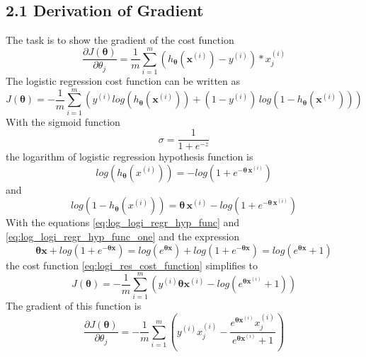\subsection{2.1 Derivation of Gradient}
\label{subsec:task_2_1}

The task is to show the gradient of the cost function
\begin{equation}\label{eq:parameters_gradient}
\frac{\partial J(\bm\theta)}{\partial \theta_{j}} = \frac{1}{m}\sum_{i=1}^{m} (h_{\bm\theta}(\bm x^{(i)}) - y^{(i)}) * x_{j}^{(i)}
\end{equation}
The logistic regression cost function can be written as
\begin{equation}
\label{eq:logi_res_cost_function}
J(\bm\theta) = - \frac{1}{m}\sum_{i=1}^{m} (y^{(i)} log(h_{\bm\theta}(\bm x^{(i)})) + (1 - y^{(i)}) \, log(1 - h_{\bm\theta}(\bm x^{(i)})))
\end{equation}
With the sigmoid function
\begin{equation}
\label{eq:sigmoid_function}
\sigma = \frac{1}{1 + e^{-z}}
\end{equation}
the logarithm of logistic regression hypothesis function is
\begin{equation}
\label{eq:log_logi_regr_hyp_func}
log( h_{\bm\theta}(x^{(i)}) )= - log(1 + e^{-\bm\theta \, \bm x^{(i)}})
\end{equation}
and 
\begin{equation}
\label{eq:log_logi_regr_hyp_func_one}
log( 1 - h_{\bm\theta}(x^{(i)}) ) = \bm\theta \, \bm x^{(i)} - log(1 + e^{-\bm\theta \, \bm x^{(i)}})
\end{equation}
With the equations \eqref{eq:log_logi_regr_hyp_func} and \eqref{eq:log_logi_regr_hyp_func_one} and the expression
\begin{equation}
\label{eq:expr_simplify}
\bm \theta \bm x + log( 1 + e^{- \bm \theta \bm x}) = log( e^{ \bm \theta \bm x} ) + log( 1 + e^{- \bm \theta \bm x}) = log( e^{ \bm \theta \bm x} + 1 )
\end{equation}
the cost function \eqref{eq:logi_res_cost_function} simplifies to
\begin{equation}
\label{eq:simp_cost_func}
J(\bm\theta) = - \frac{1}{m} \sum_{i=1}^{m} ( y^{(i)} \bm\theta \bm x^{(i)} - log( e^{ \bm\theta \bm x^{(i)} } + 1) )
\end{equation}
The gradient of this function is
\begin{equation}
\label{eq:grad_cost_func}
\frac{\partial J(\bm\theta)}{\partial \theta_{j}} = -  \frac{1}{m}\sum_{i=1}^{m} ( y^{(i)} x_{j}^{(i)} - \frac{e^{ \bm\theta \bm x^{(i)} }  x_{j}^{(i)}}{e^{ \bm\theta \bm x^{(i)} } + 1})
\end{equation}
